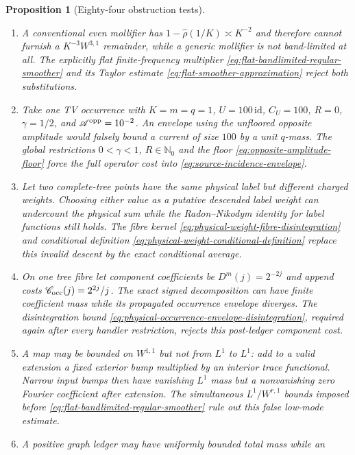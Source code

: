 \documentclass[11pt]{article}
\newtheorem{proposition}[theorem]{Proposition}
\begin{document}
\begin{proposition}[Eighty-four obstruction tests]
\begin{enumerate}[label=\textup{(T\arabic*)}]
      \eqref{eq:physical-occurrence-signed-recombination} fix its scale
      before the Markov occurrence kernel is applied.
\item A conventional even mollifier has
      $1-\widehat\rho(1/K)\asymp K^{-2}$ and therefore cannot furnish a
      $K^{-3}W^{3,1}$ remainder, while a generic mollifier is not
      band-limited at all.  The explicitly flat finite-frequency multiplier
      \eqref{eq:flat-bandlimited-regular-smoother} and its Taylor estimate
      \eqref{eq:flat-smoother-approximation} reject both substitutions.
\item Take one TV occurrence with $K=m=q=1$, $U=100\,\mathrm{id}$,
      $C_U=100$, $R=0$, $\gamma=1/2$, and
      $\mathscr A^{\rm opp}=10^{-2}$.  An envelope using the unfloored
      opposite amplitude would falsely bound a current of size $100$ by a
      unit $q$-mass.  The global restrictions $0<\gamma<1$, $R\in\mathbb N_0$
      and the floor \eqref{eq:opposite-amplitude-floor} force the full
      operator cost into \eqref{eq:source-incidence-envelope}.
\item Let two complete-tree points have the same physical label but different
      charged weights.  Choosing either value as a putative descended label
      weight can undercount the physical sum while the Radon--Nikodym identity
      for label functions still holds.  The fibre kernel
      \eqref{eq:physical-weight-fibre-disintegration} and conditional
      definition \eqref{eq:physical-weight-conditional-definition} replace
      this invalid descent by the exact conditional average.
\item On one tree fibre let component coefficients be
      $D^m(j)=2^{-2j}$ and append costs
      $\mathscr C_{\rm occ}(j)=2^{2j}/j$.  The exact signed decomposition can
      have finite coefficient mass while its propagated occurrence envelope
      diverges.  The disintegration bound
      \eqref{eq:physical-occurrence-envelope-disintegration}, required again
      after every handler restriction, rejects this post-ledger component
      cost.
\item A map may be bounded on $W^{1,1}$ but not from $L^1$ to $L^1$: add to a
      valid extension a fixed exterior bump multiplied by an interior trace
      functional.  Narrow input bumps then have vanishing $L^1$ mass but a
      nonvanishing zero Fourier coefficient after extension.  The simultaneous
      $L^1/W^{r,1}$ bounds imposed before
      \eqref{eq:flat-bandlimited-regular-smoother} rule out this false low-mode
      estimate.
\item A positive graph ledger may have uniformly bounded total mass while an

\end{enumerate}
\end{proposition}
\end{document}

